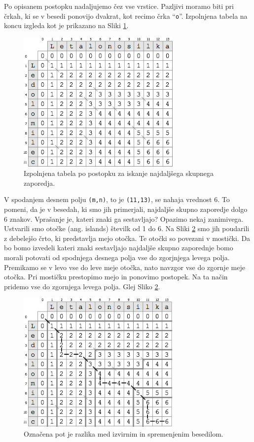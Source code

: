 \documentclass[a4paper, 12pt, twoside]{book}
\begin{document}
Po opisanem postopku nadaljujemo čez vse vrstice. Pazljivi moramo biti pri črkah, ki se v besedi ponovijo dvakrat, kot recimo črka “{\tt o}”. Izpolnjena tabela na koncu izgleda kot je prikazano na Sliki \ref{lcs4}.

\begin{figure}[placement h]
\begin{center}
\includegraphics[width=8cm]{lcs4.png}
\end{center}
\caption{Izpolnjena tabela po postopku za iskanje najdaljšega skupnega zaporedja.}
\label{lcs4}
\end{figure}

V spodanjem desnem polju {\tt (m,n)}, to je {\tt (11,13)}, se nahaja vrednost 6. To pomeni, da je v besedah, ki smo jih primerjali, najdaljše skupno zaporedje dolgo 6 znakov. Vprašanje je, kateri znaki ga sestavljajo? Opazimo nekaj zanimivega. Ustvarili smo otočke (ang. islands) številk od 1 do 6. Na Sliki \ref{lcs5} smo jih poudarili z debelejšo črto, ki predstavlja mejo otočka. Te otočki so povezani v mostički. Da bo bomo izvedeli kateri znaki sestavljajo najdaljše skupno zaporednje bomo morali potovati od spodnjega desnega polja vse do zgorjnjega levega polja. Premikamo se v levo vse do leve meje otočka, nato navzgor vse do zgornje meje otočka. Pri mostičku prestopimo mejo in ponovimo postopek. Na ta način pridemo vse do zgornjega levega polja. Glej Sliko \ref{lcs5}.

\begin{figure}[placement h]
\begin{center}
\includegraphics[width=8cm]{lcs5.png}
\end{center}
\caption{Označena pot je razlika med izvirnim in spremenjenim besedilom.}
\label{lcs5}
\end{figure}
\end{document}
